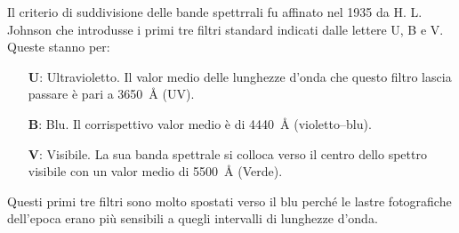         Il criterio di suddivisione delle bande spettrrali fu affinato nel 1935 da H. L. Johnson che introdusse i primi tre filtri standard indicati dalle lettere U, B e V. Queste stanno per:
        \begin{enumerate}
            \item[\textbf{U}:] Ultravioletto. Il valor medio delle lunghezze d'onda che questo filtro lascia passare è pari a \SI{3650}{\angstrom} (UV).
            \item[\textbf{B}:] Blu. Il corrispettivo valor medio è di \SI{4440}{\angstrom} (violetto--blu).
            \item[\textbf{V}:] Visibile. La sua banda spettrale si colloca verso il centro dello spettro visibile con un valor medio di \SI{5500}{\angstrom} (Verde).
        \end{enumerate}
        Questi primi tre filtri sono molto spostati verso il blu perché le lastre fotografiche dell'epoca erano più sensibili a quegli intervalli di lunghezze d'onda.